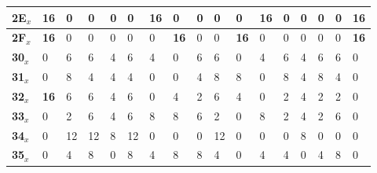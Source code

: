 \begin{longtable}[c]{|l|l|l|l|l|l|l|l|l|l|l|l|l|l|l|l|l|}
\textbf{2E$_x$} & \textbf{16}             & 0              & 0              & 0              & 0              & \textbf{16}             & 0              & 0              & 0              & 0              & \textbf{16}             & 0              & 0              & 0              & 0              & \textbf{16}             \\ \hline
\textbf{2F$_x$} & \textbf{16}             & 0              & 0              & 0              & 0              & 0              & \textbf{16}             & 0              & 0              & \textbf{16}             & 0              & 0              & 0              & 0              & 0              & \textbf{16}             \\ \hline
\textbf{30$_x$} & 0              & 6              & 6              & 4              & 6              & 4              & 0              & 6              & 6              & 0              & 4              & 6              & 4              & 6              & 6              & 0              \\ \hline
\textbf{31$_x$} & 0              & 8              & 4              & 4              & 4              & 0              & 0              & 4              & 8              & 8              & 0              & 8              & 4              & 8              & 4              & 0              \\ \hline
\textbf{32$_x$} & \textbf{16}             & 6              & 6              & 4              & 6              & 0              & 4              & 2              & 6              & 4              & 0              & 2              & 4              & 2              & 2              & 0              \\ \hline
\textbf{33$_x$} & 0              & 2              & 6              & 4              & 6              & 8              & 8              & 6              & 2              & 0              & 8              & 2              & 4              & 2              & 6              & 0              \\ \hline
\textbf{34$_x$} & 0              & 12             & 12             & 8              & 12             & 0              & 0              & 0              & 12             & 0              & 0              & 0              & 8              & 0              & 0              & 0              \\ \hline
\textbf{35$_x$} & 0              & 4              & 8              & 0              & 8              & 4              & 8              & 8              & 4              & 0              & 4              & 4              & 0              & 4              & 8              & 0              \\ \hline

\end{longtable}
